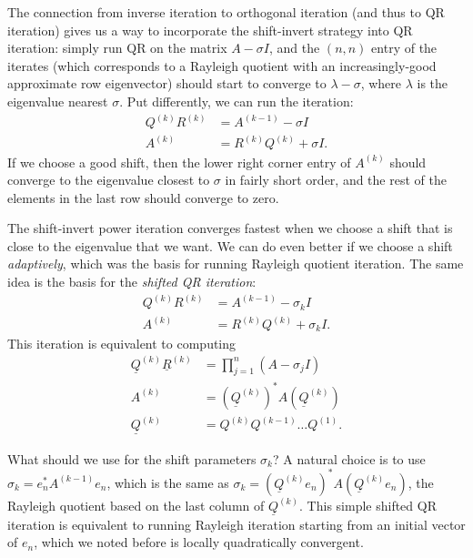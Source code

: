 \documentclass[12pt, leqno]{article} %
\newcommand{\uQ}{\underline{Q}}
\newcommand{\uR}{\underline{R}}
\begin{document}
The connection from inverse iteration to orthogonal iteration (and
thus to QR iteration) gives us a way to incorporate the shift-invert
strategy into QR iteration: simply run QR on the matrix $A-\sigma I$,
and the $(n,n)$ entry of the iterates (which corresponds to a Rayleigh
quotient with an increasingly-good approximate row eigenvector) should
start to converge to $\lambda - \sigma$, where $\lambda$ is the
eigenvalue nearest $\sigma$.  Put differently, we can run the
iteration:
\begin{align*}
  Q^{(k)} R^{(k)} &= A^{(k-1)} - \sigma I \\
  A^{(k)} &= R^{(k)} Q^{(k)} + \sigma I.
\end{align*}
If we choose a good shift, then the lower right corner entry of
$A^{(k)}$ should converge to the eigenvalue closest to $\sigma$ in
fairly short order, and the rest of the elements in the last row
should converge to zero.

The shift-invert power iteration converges fastest when we choose a
shift that is close to the eigenvalue that we want.  We can do even
better if we choose a shift {\em adaptively}, which was the basis for
running Rayleigh quotient iteration.  The same idea is the basis
for the {\em shifted QR iteration}:
\begin{align}
  Q^{(k)} R^{(k)} &= A^{(k-1)} - \sigma_k I \label{sqr-1} \\
  A^{(k)} &= R^{(k)} Q^{(k)} + \sigma_k I. \label{sqr-2}
\end{align}
This iteration is equivalent to computing
\begin{align*}
  \uQ^{(k)} \uR^{(k)} &= \prod_{j=1}^n (A-\sigma_j I) \\
  A^{(k)} &= (\uQ^{(k)})^* A (\uQ^{(k)}) \\
  \uQ^{(k)} &= Q^{(k)} Q^{(k-1)} \ldots Q^{(1)}.
\end{align*}

What should we use for the shift parameters $\sigma_k$?  A natural
choice is to use $\sigma_k = e_n^* A^{(k-1)} e_n$, which is the same
as $\sigma_k = (\uQ^{(k)} e_n)^* A (\uQ^{(k)} e_n)$, the Rayleigh quotient
based on the last column of $\uQ^{(k)}$.  This simple shifted QR iteration
is equivalent to running Rayleigh iteration starting from an initial vector
of $e_n$, which we noted before is locally quadratically convergent.
\end{document}
